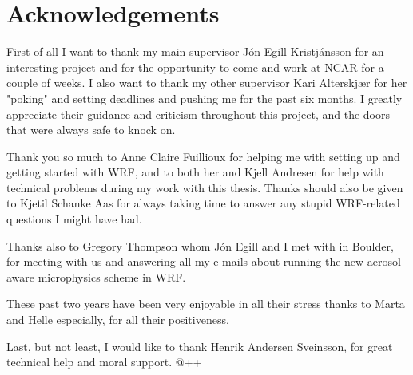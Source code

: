 \chapter*{Acknowledgements}

First of all I want to thank my main supervisor Jón Egill Kristjánsson for an interesting project and for the opportunity to come and work at NCAR for a couple of weeks. I also want to thank my other supervisor Kari Alterskjær for her "poking" and setting deadlines and pushing me for the past six months. I greatly appreciate their guidance and criticism throughout this project, and the doors that were always safe to knock on. 

Thank you so much to Anne Claire Fuillioux for helping me with setting up and getting started with WRF, and to both her and Kjell Andresen for help with technical problems during my work with this thesis. Thanks should also be given to Kjetil Schanke Aas for always taking time to answer any stupid WRF-related questions I might have had.

Thanks also to Gregory Thompson whom Jón Egill and I met with in Boulder, for meeting with us and answering all my e-mails about running the new aerosol-aware microphysics scheme in WRF.

These past two years have been very enjoyable in all their stress thanks to Marta and Helle especially, for all their positiveness.

Last, but not least, I would like to thank Henrik Andersen Sveinsson, for great technical help and moral support. @++
